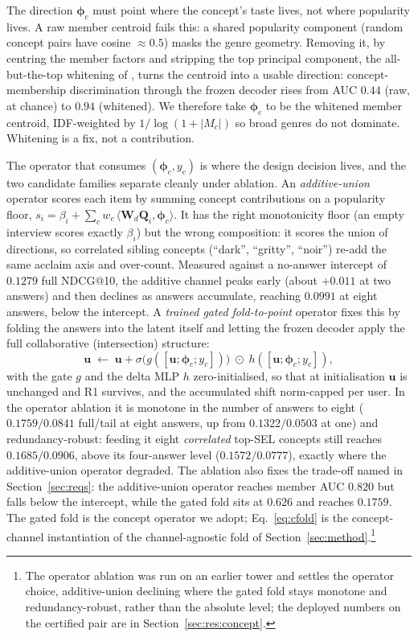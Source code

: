 \documentclass[acmsmall,review,anonymous]{acmart}
\newcommand{\Q}{\mathbf{Q}}
\newcommand{\W}{\mathbf{W}}
\newcommand{\uu}{\mathbf{u}}
\newcommand{\bphi}{\boldsymbol{\phi}}
\begin{document}
The direction $\bphi_c$ must point where the concept's taste lives, not where popularity lives. A raw member centroid fails this: a shared popularity component (random concept pairs have cosine $\approx 0.5$) masks the genre geometry. Removing it, by centring the member factors and stripping the top principal component, the all-but-the-top whitening of \citet{mu2018allbutthetop}, turns the centroid into a usable direction: concept-membership discrimination through the frozen decoder rises from AUC $0.44$ (raw, at chance) to $0.94$ (whitened). We therefore take $\bphi_c$ to be the whitened member centroid, IDF-weighted by $1/\log(1+|M_c|)$ so broad genres do not dominate. Whitening is a fix, not a contribution.

The operator that consumes $(\bphi_c,y_c)$ is where the design decision lives, and the two candidate families separate cleanly under ablation. An \emph{additive-union} operator scores each item by summing concept contributions on a popularity floor, $s_i=\beta_i+\sum_c w_c\,\langle \W_d\Q_i,\bphi_c\rangle$. It has the right monotonicity floor (an empty interview scores exactly $\beta_i$) but the wrong composition: it scores the union of directions, so correlated sibling concepts (``dark'', ``gritty'', ``noir'') re-add the same acclaim axis and over-count. Measured against a no-answer intercept of $0.1279$ full NDCG@10, the additive channel peaks early (about $+0.011$ at two answers) and then declines as answers accumulate, reaching $0.0991$ at eight answers, below the intercept. A \emph{trained gated fold-to-point} operator fixes this by folding the answers into the latent itself and letting the frozen decoder apply the full collaborative (intersection) structure:
\begin{equation}\label{eq:cfold}
  \uu \;\leftarrow\; \uu + \sigma\!\bigl(g([\uu;\bphi_c;y_c])\bigr)\;\odot\;h([\uu;\bphi_c;y_c]),
\end{equation}
with the gate $g$ and the delta MLP $h$ zero-initialised, so that at initialisation $\uu$ is unchanged and R1 survives, and the accumulated shift norm-capped per user. In the operator ablation it is monotone in the number of answers to eight ($0.1759/0.0841$ full/tail at eight answers, up from $0.1322/0.0503$ at one) and redundancy-robust: feeding it eight \emph{correlated} top-SEL concepts still reaches $0.1685/0.0906$, above its four-answer level ($0.1572/0.0777$), exactly where the additive-union operator degraded. The ablation also fixes the trade-off named in Section~\ref{sec:reqs}: the additive-union operator reaches member AUC $0.820$ but falls below the intercept, while the gated fold sits at $0.626$ and reaches $0.1759$. The gated fold is the concept operator we adopt; Eq.~\eqref{eq:cfold} is the concept-channel instantiation of the channel-agnostic fold of Section~\ref{sec:method}.\footnote{The operator ablation was run on an earlier tower and settles the operator choice, additive-union declining where the gated fold stays monotone and redundancy-robust, rather than the absolute level; the deployed numbers on the certified pair are in Section~\ref{sec:res:concept}.}
\end{document}
